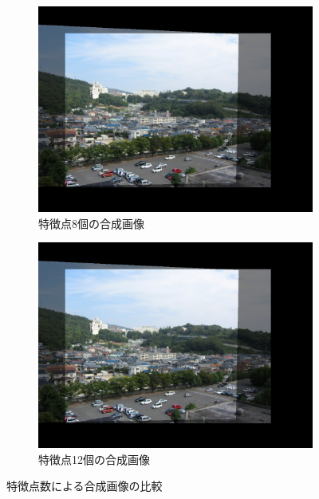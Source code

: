 \documentclass[autodetect-engine,dvi=dvipdfmx,ja=standard,
               a4j,11pt]{bxjsarticle}
\begin{document}
\begin{figure}[h]
 \centering
 \begin{subfigure}[b]{0.45\textwidth}
   \centering
   \includegraphics[scale=0.2]{3-1.W-8.jpg}
   \caption{特徴点8個の合成画像}
   \label{fig:3-1.W-8.jpg}
 \end{subfigure}
 \hspace{5mm}
 \begin{subfigure}[b]{0.45\textwidth}
   \centering
   \includegraphics[scale=0.2]{3-1.W-12.jpg}
   \caption{特徴点12個の合成画像}
   \label{fig:3-1.W-12.jpg}
 \end{subfigure}
 \caption{特徴点数による合成画像の比較}
 \label{fig:comparison_W}
\end{figure}
\end{document}
